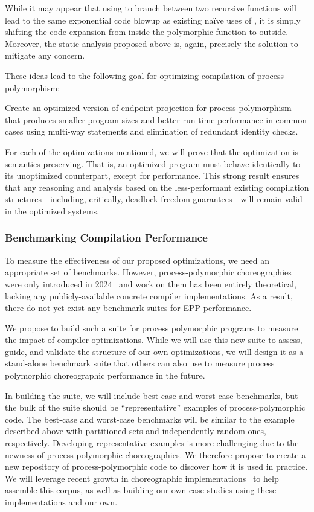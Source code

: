 While it may appear that using \AmIN to branch between two recursive functions will
lead to the same exponential code blowup as existing na\"ive uses of \AmIN,
it is simply shifting the code expansion from inside the polymorphic function to outside.
Moreover, the static analysis proposed above is, again, precisely the solution to mitigate any concern.

These ideas lead to the following goal for optimizing compilation of process polymorphism:
\begin{goal}
  \label{goal:opt-epp}
  Create an optimized version of endpoint projection for process polymorphism
  that produces smaller program sizes and better run-time performance in common cases
  using multi-way \AmIN statements and elimination of redundant identity checks.
\end{goal}

For each of the optimizations mentioned, we will prove that the optimization is semantics-preserving.
That is, an optimized program must behave identically to its unoptimized counterpart, except for performance.
This strong result ensures that any reasoning and analysis based on the less-performant
existing compilation structures---including, critically, deadlock freedom guarantees---will remain valid in the optimized systems.

\subsubsection{Benchmarking Compilation Performance}

To measure the effectiveness of our proposed optimizations, we need an appropriate set of benchmarks.
However, process-polymorphic choreographies were only introduced in 2024~\citep{GraversenHM24}
and work on them has been entirely theoretical, lacking any publicly-available concrete compiler implementations.
As a result, there do not yet exist any benchmark suites for EPP performance.

We propose to build such a suite for process polymorphic programs to measure the impact of compiler optimizations.
While we will use this new suite to assess, guide, and validate the structure of our own optimizations,
we will design it as a stand-alone benchmark suite that others can also use to measure process polymorphic choreographic performance in the future.

In building the suite, we will include best-case and worst-case benchmarks, but the bulk of the suite should be ``representative'' examples of process-polymorphic code.
The best-case and worst-case benchmarks will be similar to the example described above
with partitioned sets and independently random ones, respectively.
Developing representative examples is more challenging due to the newness of process-polymorphic choreographies.
We therefore propose to create a new repository of process-polymorphic code to discover how it is used in practice.
We will leverage recent growth in choreographic implementations~\citep{ShenKK23,BatesK+25}
to help assemble this corpus, as well as building our own case-studies using these implementations and our own.

